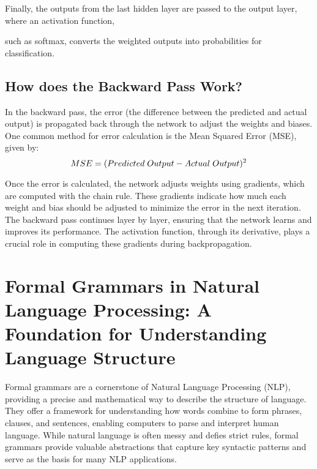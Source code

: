 	  Finally, the outputs from the last hidden layer are passed to the output layer, where an activation function,
	  
	   such as softmax, converts the weighted outputs into probabilities for classification.
	   
    \vspace{0.5cm}
    
    \subsection{How does the Backward Pass Work?}
    
    \vspace{0.3cm}
    
    In the backward pass, the error (the difference between the predicted and actual output) is propagated back through the network to adjust the weights and biases. One common method for error calculation is the Mean Squared Error (MSE), given by:
    \begin{equation}
    MSE = (Predicted \hspace{0.1cm} Output - Actual \hspace{0.1cm} Output)^2
\end{equation}
    
    Once the error is calculated, the network adjusts weights using gradients, which are computed with the chain rule. These gradients indicate how much each weight and bias should be adjusted to minimize the error in the next iteration. The backward pass continues layer by layer, ensuring that the network learns and improves its performance. The activation function, through its derivative, plays a crucial role in computing these gradients during backpropagation.
\section{Formal Grammars in Natural Language Processing: A Foundation for Understanding Language Structure}
	Formal grammars are a cornerstone of Natural Language Processing (NLP), providing a precise and mathematical way to describe the structure of language.  They offer a framework for understanding how words combine to form phrases, clauses, and sentences, enabling computers to parse and interpret human language.  While natural language is often messy and defies strict rules, formal grammars provide valuable abstractions that capture key syntactic patterns and serve as the basis for many NLP applications.   
	
